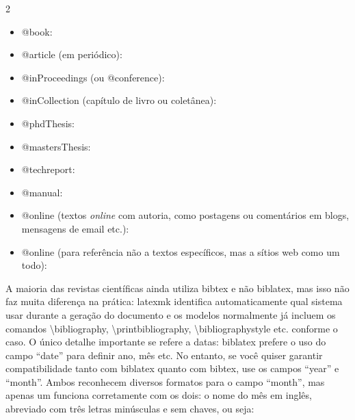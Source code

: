 \begin{multicols}{2}
  \LaTeXraggedright
  \begin{itemize}
    \item @book: \cite{knuth:96}

    \item @article (em periódico): \cite{floats2014}

    \item @inProceedings (ou @conference): \cite{dbevolution}

    \item @inCollection (capítulo de livro ou coletânea):
          \cite{gridpat}

    \item @phdThesis: \cite{curie}

    \item @mastersThesis: \cite{shannon}

    \item @techreport: \cite{yoon23}

    \item @manual: \cite{biblatex}

    \item @online (textos \emph{online} com autoria, como postagens ou
          comentários em blogs, mensagens de email etc.): \cite{gnu83}

    \item @online (para referência não a textos específicos,
          mas a sítios web como um todo): \cite{FSF}
  \end{itemize}
\end{multicols}

A maioria das revistas científicas ainda utiliza bibtex e não
biblatex, mas isso não faz muita diferença na prática: \textsf{latexmk}
identifica automaticamente qual sistema usar durante a geração do
documento e os modelos normalmente já incluem os comandos
\textsf{\textbackslash{}bibliography},
\textsf{\textbackslash{}printbibliography},
\textsf{\textbackslash{}bibliographystyle} etc. conforme o caso.
O único detalhe importante se refere a datas:
\textsf{biblatex} prefere o uso do campo ``date'' para definir ano, mês
etc. No entanto, se você quiser garantir compatibilidade tanto com
\textsf{biblatex} quanto com \textsf{bibtex}, use os campos ``year'' e
``month''. Ambos reconhecem diversos formatos para o campo ``month'',
mas apenas um funciona corretamente com os dois: o nome do mês em inglês,
abreviado com três letras minúsculas e sem chaves, ou seja:

